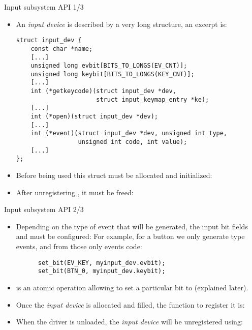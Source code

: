 \begin{frame}[fragile]{Input subsystem API 1/3}
  \begin{itemize}
  \item An {\em input device} is described by a very long
     structure, an excerpt is:
    \begin{block}{}
    \begin{verbatim}
struct input_dev {
    const char *name;
    [...]
    unsigned long evbit[BITS_TO_LONGS(EV_CNT)];
    unsigned long keybit[BITS_TO_LONGS(KEY_CNT)];
    [...]
    int (*getkeycode)(struct input_dev *dev,
                      struct input_keymap_entry *ke);
    [...]
    int (*open)(struct input_dev *dev);
    [...]
    int (*event)(struct input_dev *dev, unsigned int type,
                 unsigned int code, int value);
    [...]
};
\end{verbatim}
\end{block}
\item Before being used this struct must be allocated and initialized:
\item After unregistering , it must be freed:
  \end{itemize}
\end{frame}

\begin{frame}[fragile]{Input subsystem API 2/3}
  \begin{itemize}
  \item Depending on the type of event that will be generated, the
    input bit fields  and  must be configured:
    For example, for a button we only generate
     type events, and from those only  events
    code:
    \begin{block}{}
    \begin{verbatim}
      set_bit(EV_KEY, myinput_dev.evbit);
      set_bit(BTN_0, myinput_dev.keybit);
    \end{verbatim}
    \end{block}
  \item {} is an atomic operation allowing to set a particular bit
        to  (explained later).
  \item Once the {\em input device} is allocated and filled, the
    function to register it
    is: 
  \item When the driver is unloaded, the {\em input device} will be
    unregistered using:
  \end{itemize}
\end{frame}

